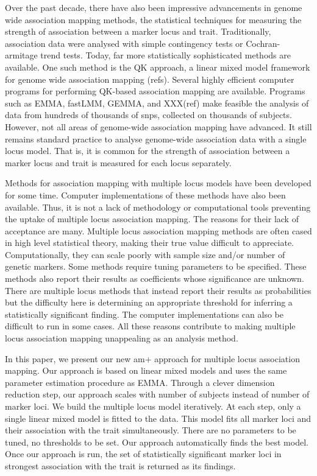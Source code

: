 \documentclass[12pt]{article}
\begin{document}
Over the past decade, there have also been impressive advancements in genome wide 
association mapping methods, the statistical techniques for measuring the strength of 
association between a marker locus and trait. Traditionally, association data were 
analysed with simple contingency tests or Cochran-armitage  trend tests. Today, far 
more statistically sophisticated methods are available. One such method is the  QK 
approach, a linear mixed model framework for genome wide association 
mapping (refs).  Several highly efficient computer programs for performing QK-based 
association mapping are available. Programs such as EMMA, fastLMM, GEMMA, and 
XXX(ref) make feasible the analysis of data from hundreds of thousands of snps, collected 
on thousands of subjects. However, not all areas of genome-wide association 
mapping have advanced. It still remains standard practice to analyse genome-wide 
association data with a single locus model. That is,  it is common for the strength of 
association between a marker locus and trait is measured for each locus separately. 

Methods for association mapping with multiple locus models have been developed 
for some time. Computer implementations of these methods have also been available. 
Thus, it is not a lack of methodology  or computational tools preventing the uptake of 
multiple locus association mapping. The reasons for their lack of acceptance are many. 
Multiple locus association mapping methods are often cased in high level statistical theory, 
making their true value difficult to appreciate.  Computationally, they can scale poorly with 
sample size and/or number of genetic markers. Some methods require tuning parameters 
to be specified. These methods also report their results as coefficients whose significance 
are unknown. There are multiple locus methods that instead report their results as probabilities 
but the difficulty here is determining  an appropriate threshold for inferring a statistically 
significant finding. The computer implementations can also be difficult to run in some cases. 
All these reasons contribute to making multiple locus association mapping unappealing as 
an analysis method.

In this paper, we present our new am+ approach for multiple locus association mapping. 
Our approach is based on linear mixed models and uses the same parameter estimation 
procedure as EMMA. Through a clever dimension reduction step, our approach scales 
with number of subjects instead of number of marker loci. We build the multiple locus 
model iteratively. At each step, only a single linear mixed model is fitted to the data. 
This model fits all marker loci and their association with the trait simultaneously. There 
are no parameters to be tuned, no thresholds to be set. Our approach automatically 
finds the best model. Once our approach is run, the set of statistically significant 
marker loci in strongest association with the trait is returned as its findings.  
\end{document}
